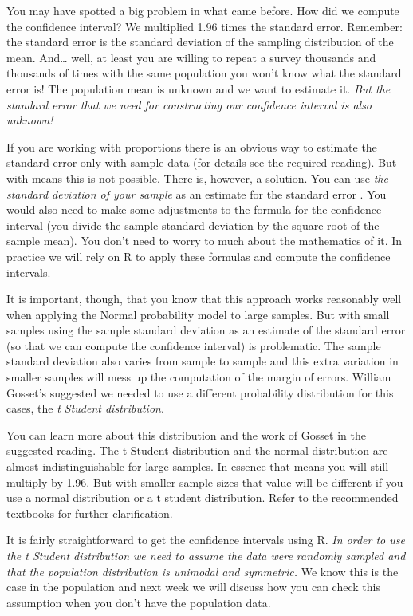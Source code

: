 \documentclass[
]{book}
\begin{document}
You may have spotted a big problem in what came before. How did we compute the confidence interval? We multiplied 1.96 times the standard error. Remember: the standard error is the standard deviation of the sampling distribution of the mean. And\ldots{} well, at least you are willing to repeat a survey thousands and thousands of times with the same population you won't know what the standard error is! The population mean is unknown and we want to estimate it. \emph{But the standard error that we need for constructing our confidence interval is also unknown!}

If you are working with proportions there is an obvious way to estimate the standard error only with sample data (for details see the required reading). But with means this is not possible. There is, however, a solution. You can use \emph{the standard deviation of your sample} as an estimate for the standard error . You would also need to make some adjustments to the formula for the confidence interval (you divide the sample standard deviation by the square root of the sample mean). You don't need to worry to much about the mathematics of it. In practice we will rely on R to apply these formulas and compute the confidence intervals.

It is important, though, that you know that this approach works reasonably well when applying the Normal probability model to large samples. But with small samples using the sample standard deviation as an estimate of the standard error (so that we can compute the confidence interval) is problematic. The sample standard deviation also varies from sample to sample and this extra variation in smaller samples will mess up the computation of the margin of errors. William Gosset's suggested we needed to use a different probability distribution for this cases, the \emph{t Student distribution}.

You can learn more about this distribution and the work of Gosset in the suggested reading. The t Student distribution and the normal distribution are almost indistinguishable for large samples. In essence that means you will still multiply by 1.96. But with smaller sample sizes that value will be different if you use a normal distribution or a t student distribution. Refer to the recommended textbooks for further clarification.

It is fairly straightforward to get the confidence intervals using R. \emph{In order to use the t Student distribution we need to assume the data were randomly sampled and that the population distribution is unimodal and symmetric.} We know this is the case in the population and next week we will discuss how you can check this assumption when you don't have the population data.
\end{document}
